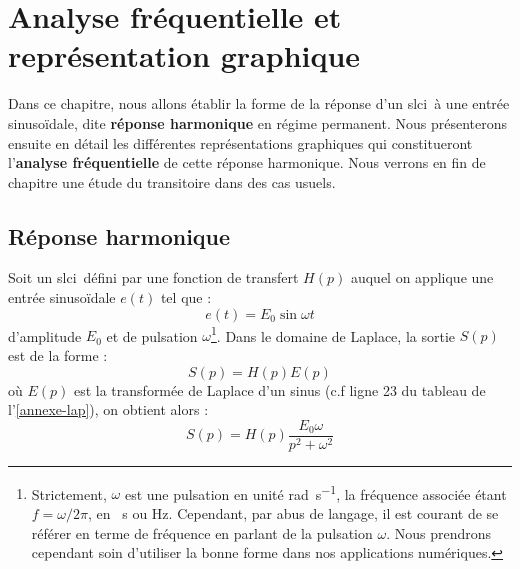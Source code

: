 \chapter[Analyse fréquentielle]{Analyse fréquentielle et représentation graphique\label{chap-anafreq}}
\minitoc
\newpage


Dans ce chapitre, nous allons établir la forme de la réponse d'un \gls{slci}~à une entrée sinuso\"idale, dite 
\textbf{réponse harmonique} en régime permanent.
Nous présenterons ensuite en détail les différentes représentations graphiques qui 
constitueront l'\textbf{analyse fréquentielle} de cette réponse harmonique.
Nous verrons en fin de chapitre une étude du transitoire dans des cas usuels.


\section{Réponse harmonique}


Soit un \gls{slci}~défini par une fonction de transfert $H(p)$ auquel on applique 
une entrée sinuso\"idale $e(t)$ tel que :
$$
e(t)=E_0\sin\omega t 
$$
d'amplitude $E_0$ et de pulsation $\omega$\footnote{Strictement, $\omega$ est une 
pulsation en unité \si{\radian\per\second}, la fréquence associée étant $f=\omega/2\pi$, 
en \si{\per\second} ou \si{\hertz}. Cependant, 
par abus de langage, il est courant de se référer en terme de fréquence en parlant de la pulsation $\omega$. 
Nous prendrons cependant soin d'utiliser la bonne forme dans nos applications numériques.}.
Dans le domaine de Laplace, la sortie $S(p)$ est de la forme :
$$
S(p)=H(p)E(p)
$$
où $E(p)$ est la transformée de Laplace d'un sinus (c.f ligne 23 du tableau de l'\cref{annexe-lap}), 
on obtient alors :
$$
S(p)=H(p)\dfrac{E_0\omega}{p^2+\omega^2}
$$

